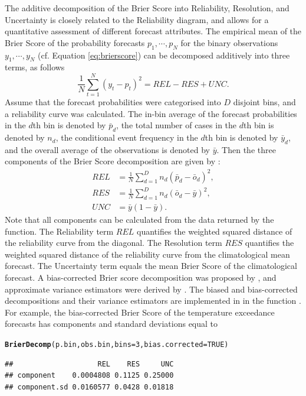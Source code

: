 \documentclass[article]{jss}\usepackage{graphicx, color}
\makeatletter
\newcommand{\hlfunctioncall}[1]{\textcolor[rgb]{0,0.501960784313725,0.752941176470588}{\textbf{#1}}}%
\newenvironment{kframe}{%
 \def\at@end@of@kframe{}%
 \ifinner\ifhmode%
  \def\at@end@of@kframe{\end{minipage}}%
  \begin{minipage}{\columnwidth}%
 \fi\fi%
 \def\FrameCommand##1{\hskip\@totalleftmargin \hskip-\fboxsep
 \colorbox{shadecolor}{##1}\hskip-\fboxsep
     \hskip-\linewidth \hskip-\@totalleftmargin \hskip\columnwidth}%
 \MakeFramed {\advance\hsize-\width
   \@totalleftmargin\z@ \linewidth\hsize
   \@setminipage}}%
 {\par\unskip\endMakeFramed%
 \at@end@of@kframe}
\newenvironment{knitrout}{}{} %
\makeatother
\begin{document}
The additive decomposition of the Brier Score into Reliability, Resolution, and Uncertainty is closely related to the Reliability diagram, and allows for a quantitative assessment of different forecast attributes.
The empirical mean of the Brier Score of the probability forecasts $p_1, \cdots, p_N$ for the binary observations $y_1, \cdots, y_N$ (cf. Equation \ref{eq:brierscore}) can be decomposed additively into three terms, as follows
%
\begin{equation}
\frac{1}{N}\sum_{t=1}^N (y_t - p_t)^2 = REL - RES + UNC.
\end{equation}
%
Assume that the forecast probabilities were categorised into $D$ disjoint bins, and a reliability curve was calculated.
The in-bin average of the forecast probabilities in the $d$th bin is denoted by $\bar{p}_d$, the total number of cases in the $d$th bin is denoted by $n_d$, the conditional event frequency in the $d$th bin is denoted by $\bar{y}_d$, and the overall average of the observations is denoted by $\bar{y}$.
Then the three components of the Brier Score decomposition are given by \citet{murphy1973new}:
%
\begin{align}
REL & = \frac{1}{N}\sum_{d=1}^D n_d (\bar{p}_d - \bar{o}_d)^2,\\
RES & = \frac{1}{N}\sum_{d=1}^D n_d (\bar{o}_d - \bar{y})^2,\\
UNC & = \bar{y}(1-\bar{y}).
\end{align}
%
Note that all components can be calculated from the data returned by the  function.
The Reliability term $REL$ quantifies the weighted squared distance of the reliability curve from the diagonal.
The Resolution term $RES$ quantifies the weighted squared distance of the reliability curve from the climatological mean forecast.
The Uncertainty term equals the mean Brier Score of the climatological forecast.
A bias-corrected Brier score decomposition was proposed by \citet{ferro2012bias}, and approximate variance estimators were derived by \citet{siegert2013variance}.
The biased and bias-corrected decompositions and their variance estimators are implemented in  in the function .
For example, the bias-corrected Brier Score of the temperature exceedance forecasts has components and standard deviations equal to
%
\begin{knitrout}
\color{fgcolor}\begin{kframe}
\begin{alltt}
\hlfunctioncall{BrierDecomp}(p.bin, obs.bin, bins=3, bias.corrected=TRUE)
\end{alltt}
\begin{verbatim}
##                    REL    RES     UNC
## component    0.0004808 0.1125 0.25000
## component.sd 0.0160577 0.0428 0.01818
\end{verbatim}
\end{kframe}
\end{knitrout}
\end{document}
